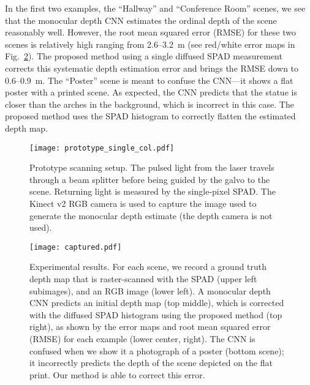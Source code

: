 In the first two examples, the ``Hallway'' and ``Conference Room'' scenes, we
see that the monocular depth CNN estimates the ordinal depth of the scene
reasonably well. However, the root mean squared error (RMSE) for these two
scenes is relatively high ranging from 2.6--3.2~m (see red/white error maps in
Fig.~\ref{fig:results_captured}). The proposed method using a single diffused
SPAD measurement corrects this systematic depth estimation error and brings the
RMSE down to 0.6--0.9~m. The ``Poster'' scene is meant to confuse the CNN---it
shows a flat poster with a printed scene. As expected, the CNN predicts that the
statue is closer than the arches in the background, which is incorrect in this
case. The proposed method uses the SPAD histogram to correctly flatten the
estimated depth map.

\begin{figure}[t]
	\centering
  \texttt{[image: prototype\_single\_col.pdf]}
  \caption{Prototype scanning setup. The pulsed light from the laser travels
    through a beam splitter before being guided by the galvo to the scene.
    Returning light is measured by the single-pixel SPAD. The Kinect v2 RGB 
    camera is used to capture the image used to generate the monocular depth estimate
    (the depth camera is not used).}
  \label{fig:prototype}
\end{figure}
\begin{figure}[t]
	\centering
	\texttt{[image: captured.pdf]}
	\caption{Experimental results. For each scene, we record a ground truth depth
    map that is raster-scanned with the SPAD (upper left subimages), and an RGB
    image (lower left). A monocular depth CNN predicts an initial depth map (top
    middle), which is corrected with the diffused SPAD histogram using the
    proposed method (top right), as shown by the error maps and root mean
    squared error (RMSE) for each example (lower center, right). The CNN is
    confused when we show it a photograph of a poster (bottom scene); it
    incorrectly predicts the depth of the scene depicted on the flat print. Our
    method is able to correct this error.}
	\label{fig:results_captured}
\end{figure}


